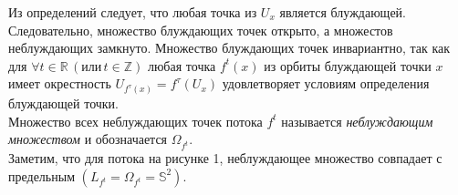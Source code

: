 
\noindent Из определений следует, что любая точка из \(U_{x} \) является блуждающей. Следовательно, множество 
блуждающих точек открыто, а множестов неблуждающих замкнуто. Множество блуждающих
точек инвариантно, так как для \(\forall t \in \mathbb{R}\, (\text{или}\, t \in \mathbb{Z})\) любая точка \(f^t(x)\) из орбиты блуждающей точки
\(x\) имеет окрестность \(U_{f^{\tau}(x)} = f^{\tau}(U_{x})\) удовлетворяет условиям определения блуждающей точки. 
\\[1mm]
Множество всех неблуждающих точек потока \(f^t\) называется \textit{неблуждающим множеством} и обозначается \(\Omega_{f^t}\). 
\\[2mm]
Заметим, что для потока на рисунке 1, неблуждающее множество совпадает с предельным \((L_{f^{t}} = \Omega_{f^t} = \mathbb{S}^2 )\). 

